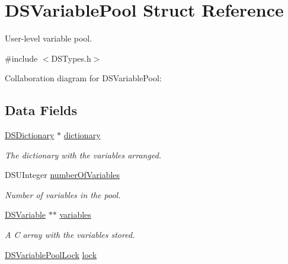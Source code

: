 \hypertarget{struct_d_s_variable_pool}{
\section{DSVariablePool Struct Reference}
\label{struct_d_s_variable_pool}
}


User-\/level variable pool.  




{\ttfamily \#include $<$DSTypes.h$>$}



Collaboration diagram for DSVariablePool:\subsection*{Data Fields}
\begin{DoxyCompactItemize}
\item 
\hypertarget{struct_d_s_variable_pool_a16fbefb689b48e0f527e719dd511a61a}{
\hyperlink{struct_d_s_dictionary}{DSDictionary} $\ast$ \hyperlink{struct_d_s_variable_pool_a16fbefb689b48e0f527e719dd511a61a}{dictionary}}
\label{struct_d_s_variable_pool_a16fbefb689b48e0f527e719dd511a61a}

\begin{DoxyCompactList}\small\item\em The dictionary with the variables arranged. \item\end{DoxyCompactList}\item 
\hypertarget{struct_d_s_variable_pool_a8009f1b6a6b6928ede40a712f02fcf76}{
DSUInteger \hyperlink{struct_d_s_variable_pool_a8009f1b6a6b6928ede40a712f02fcf76}{numberOfVariables}}
\label{struct_d_s_variable_pool_a8009f1b6a6b6928ede40a712f02fcf76}

\begin{DoxyCompactList}\small\item\em Number of variables in the pool. \item\end{DoxyCompactList}\item 
\hypertarget{struct_d_s_variable_pool_a648ae5e458f3a5847972fe54e7d80b05}{
\hyperlink{struct_d_s_variable}{DSVariable} $\ast$$\ast$ \hyperlink{struct_d_s_variable_pool_a648ae5e458f3a5847972fe54e7d80b05}{variables}}
\label{struct_d_s_variable_pool_a648ae5e458f3a5847972fe54e7d80b05}

\begin{DoxyCompactList}\small\item\em A C array with the variables stored. \item\end{DoxyCompactList}\item 
\hypertarget{struct_d_s_variable_pool_a2a01a6a9c8466d41ba7598d4f811f4f9}{
\hyperlink{_d_s_types_8h_a62ad4772439f753c78f5dc086130d6ea}{DSVariablePoolLock} \hyperlink{struct_d_s_variable_pool_a2a01a6a9c8466d41ba7598d4f811f4f9}{lock}}
\label{struct_d_s_variable_pool_a2a01a6a9c8466d41ba7598d4f811f4f9}


\end{DoxyCompactItemize}
